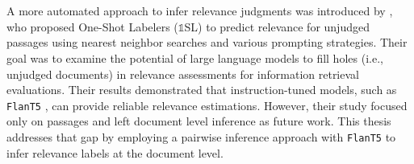\\\\
A more automated approach to infer relevance judgments was introduced by \citet{macavaney:2023}, who proposed One-Shot Labelers ($\mathbb{1}$SL) to predict relevance for unjudged passages using nearest neighbor searches and various prompting strategies. Their goal was to examine the potential of large language models to fill \glqq holes\grqq{} (i.e., unjudged documents) in relevance assessments for information retrieval evaluations. Their results demonstrated that instruction-tuned models, such as \texttt{FlanT5} \citep{chung:2022}, can provide reliable relevance estimations. However, their study focused only on passages and left document level inference as future work. This thesis addresses that gap by employing a pairwise inference approach with \texttt{FlanT5} to infer relevance labels at the document level.
\\\\
